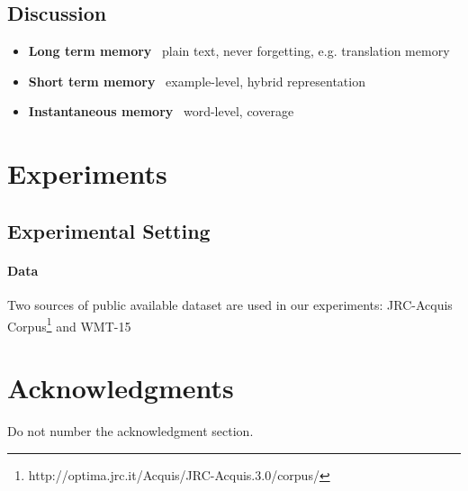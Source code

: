 \documentclass[11pt,letterpaper]{article}
\begin{document}
\subsection{Discussion}
\begin{itemize}
\item \textbf{Long term memory}~ plain text, never forgetting, e.g. translation memory
\item \textbf{Short term memory}~ example-level, hybrid representation
\item \textbf{Instantaneous memory}~ word-level, coverage
\end{itemize}


\section{Experiments}
\subsection{Experimental Setting}
\paragraph{Data} Two sources of public available dataset are used in our experiments: JRC-Acquis Corpus\footnote{http://optima.jrc.it/Acquis/JRC-Acquis.3.0/corpus/} and WMT-15

\section*{Acknowledgments}

Do not number the acknowledgment section.



\end{document}
